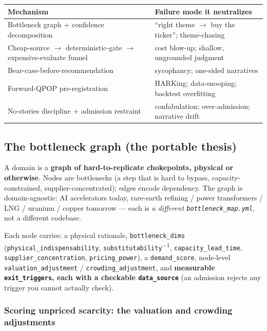\documentclass[11pt]{article}
\begin{document}
\begin{center}
\begin{tabularx}{\linewidth}{@{}LL@{}}
\toprule
\textbf{Mechanism} & \textbf{Failure mode it neutralizes} \\
\midrule
Bottleneck graph + confidence decomposition & ``right theme $\to$ buy the ticker''; theme-chasing \\
Cheap-source $\to$ deterministic-gate $\to$ expensive-evaluate funnel & cost blow-up; shallow, ungrounded judgment \\
Bear-case-before-recommendation & sycophancy; one-sided narratives \\
Forward-QPOP pre-registration & HARKing; data-snooping; backtest overfitting \\
No-stories discipline + admission restraint & confabulation; over-admission; narrative drift \\
\bottomrule
\end{tabularx}
\end{center}

\subsection{The bottleneck graph (the portable thesis)}

A domain is a \textbf{graph of hard-to-replicate chokepoints, physical or otherwise}. Nodes are bottlenecks (a step that is hard to
bypass, capacity-constrained, supplier-concentrated); edges encode dependency. The graph is
domain-agnostic: AI accelerators today, rare-earth refining / power transformers / LNG / uranium /
copper tomorrow --- each is \emph{a different \texttt{bottleneck\_map.yml}}, not a different codebase.

Each node carries: a physical rationale, \texttt{bottleneck\_dims}
(\texttt{physical\_indispensability}, \texttt{substitutability}\textsuperscript{$-1$},
\texttt{capacity\_lead\_time}, \texttt{supplier\_concentration}, \texttt{pricing\_power}), a
\texttt{demand\_score}, node-level \texttt{valuation\_adjustment} / \texttt{crowding\_adjustment},
and \textbf{measurable \texttt{exit\_triggers}, each with a checkable \texttt{data\_source}} (an
admission rejects any trigger you cannot actually check).

\subsubsection*{Scoring unpriced scarcity: the valuation and crowding adjustments}
\end{document}
